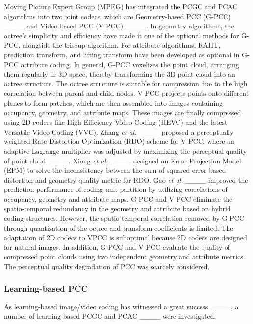 Moving Picture Expert Group (MPEG) has integrated the PCGC and PCAC algorithms into two joint codecs, which are Geometry-based PCC (G-PCC) ____ and Video-based PCC (V-PCC) ____. In geometry algorithms, the octree's simplicity and efficiency have made it one of the optional methods for G-PCC, alongside the trisoup algorithm. For attribute algorithms, RAHT, prediction transform, and lifting transform have been developed as optional in G-PCC attribute coding. In general, G-PCC voxelizes the point cloud, arranging them regularly in 3D space, thereby transforming the 3D point cloud into an octree structure. The octree structure is suitable for compression due to the high correlation between parent and child nodes.
V-PCC projects points onto different planes to form patches, which are then assembled into images containing occupancy, geometry, and attribute maps. These images are finally compressed using 2D codecs like High Efficiency Video Coding (HEVC) and the latest Versatile Video Coding (VVC).
Zhang \textit{et al.} ____ proposed a perceptually weighted Rate-Distortion Optimization (RDO) scheme for V-PCC, where an adaptive Lagrange multiplier was adjusted by maximizing the perceptual quality of point cloud ____. Xiong \textit{et al.} ____ designed an Error Projection Model (EPM) to solve the inconsistency between the sum of squared error based distortion and geometry quality metric for RDO. Gao \textit{et al.} ____ improved the prediction  performance of coding unit partition by utilizing correlations of occupancy, geometry and attribute maps.
G-PCC and V-PCC eliminate the spatio-temporal redundancy in the geometry and attribute based on hybrid coding structures. However, the spatio-temporal correlation removed by G-PCC through quantization of the octree and transform coefficients is limited. The adaptation of 2D codecs to VPCC is suboptimal because 2D codecs are designed for natural images. In addition, G-PCC and V-PCC evaluate the quality of compressed point clouds using two independent geometry and attribute metrics. The perceptual quality degradation of PCC was scarcely considered.

\subsubsection{Learning-based PCC}
			
As learning-based image/video coding has witnessed a great success ____, a number of learning based PCGC and PCAC ____ were investigated.

